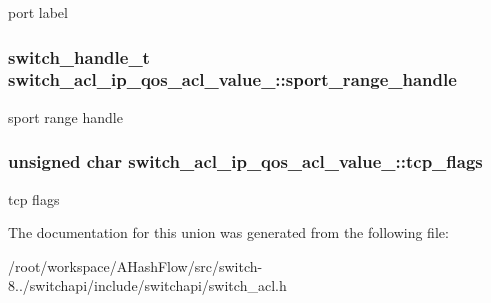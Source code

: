 port label \hypertarget{unionswitch__acl__ip__qos__acl__value___a4c797914cb853b341f70ce0c8d8941ec}{
\subsubsection[{sport\+\_\+range\+\_\+handle}]{\setlength{\rightskip}{0pt plus 5cm}switch\+\_\+handle\+\_\+t switch\+\_\+acl\+\_\+ip\+\_\+qos\+\_\+acl\+\_\+value\+\_\+\+::sport\+\_\+range\+\_\+handle}}\label{unionswitch__acl__ip__qos__acl__value___a4c797914cb853b341f70ce0c8d8941ec}
sport range handle \hypertarget{unionswitch__acl__ip__qos__acl__value___a0e92623f12368a641dcc3df025dfa0d3}{
\subsubsection[{tcp\+\_\+flags}]{\setlength{\rightskip}{0pt plus 5cm}unsigned char switch\+\_\+acl\+\_\+ip\+\_\+qos\+\_\+acl\+\_\+value\+\_\+\+::tcp\+\_\+flags}}\label{unionswitch__acl__ip__qos__acl__value___a0e92623f12368a641dcc3df025dfa0d3}
tcp flags 

The documentation for this union was generated from the following file\+:\begin{DoxyCompactItemize}
\item 
/root/workspace/\+A\+Hash\+Flow/src/switch-\/8../switchapi/include/switchapi/switch\+\_\+acl.\+h\end{DoxyCompactItemize}
